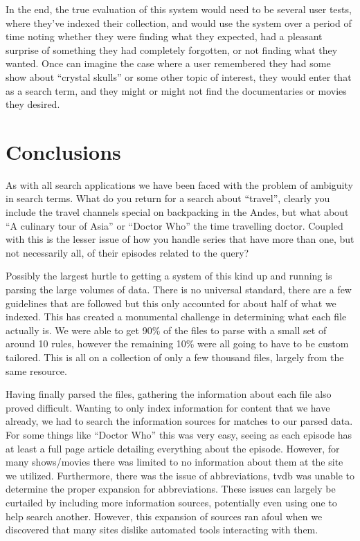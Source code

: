 \documentclass{acm_proc_article-sp}
\begin{document}
In the end, the true evaluation of this system would need to be several user tests, where they’ve indexed their collection, and would use the system over a period of time noting whether they were finding what they expected, had a pleasant surprise of something they had completely forgotten, or not finding what they wanted.  Once can imagine the case where a user remembered they had some show about “crystal skulls” or some other topic of interest, they would enter that as a search term, and they might or might not find the documentaries or movies they desired.


\section{Conclusions}
    As with all search applications we have been faced with the problem of ambiguity in search terms. What do you return for a search about “travel”, clearly you include the travel channels special on backpacking in the Andes, but what about “A culinary tour of Asia” or “Doctor Who” the time travelling doctor. Coupled with this is the lesser issue of how you handle series that have more than one, but not necessarily all, of their episodes related to the query?

    Possibly the largest hurtle to getting a system of this kind up and running is parsing the large volumes of data. There is no universal standard, there are a few guidelines that are followed but this only accounted for about half of what we indexed. This has created a monumental challenge in determining what each file actually is. We were able to get 90\% of the files to parse with a small set of around 10 rules, however the remaining 10\% were all going to have to be custom tailored. This is all on a collection of only a few thousand files, largely from the same resource.

    Having finally parsed the files, gathering the information about each file also proved difficult. Wanting to only index information for content that we have already, we had to search the information sources for matches to our parsed data. For some things like “Doctor Who” this was very easy, seeing as each episode has at least a full page article detailing everything about the episode. However, for many shows/movies there was limited to no information about them at the site we utilized. Furthermore, there was the issue of abbreviations, tvdb was unable to determine the proper expansion for abbreviations. These issues can largely be curtailed by including more information sources, potentially even using one to help search another. However, this expansion of sources ran afoul when we discovered that many sites dislike automated tools interacting with them.
\end{document}
